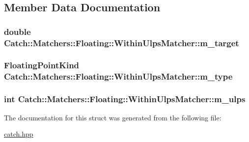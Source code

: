 \subsection{Member Data Documentation}
\hypertarget{struct_catch_1_1_matchers_1_1_floating_1_1_within_ulps_matcher_a97b0112726f510af8ca22cb490c2b14d}{
\subsubsection[{m\-\_\-target}]{\setlength{\rightskip}{0pt plus 5cm}double Catch\-::\-Matchers\-::\-Floating\-::\-Within\-Ulps\-Matcher\-::m\-\_\-target\hspace{0.3cm}{\ttfamily [private]}}}\label{struct_catch_1_1_matchers_1_1_floating_1_1_within_ulps_matcher_a97b0112726f510af8ca22cb490c2b14d}
\hypertarget{struct_catch_1_1_matchers_1_1_floating_1_1_within_ulps_matcher_ac5dc48ae38dbfe143647d450f03771ab}{
\subsubsection[{m\-\_\-type}]{\setlength{\rightskip}{0pt plus 5cm}Floating\-Point\-Kind Catch\-::\-Matchers\-::\-Floating\-::\-Within\-Ulps\-Matcher\-::m\-\_\-type\hspace{0.3cm}{\ttfamily [private]}}}\label{struct_catch_1_1_matchers_1_1_floating_1_1_within_ulps_matcher_ac5dc48ae38dbfe143647d450f03771ab}
\hypertarget{struct_catch_1_1_matchers_1_1_floating_1_1_within_ulps_matcher_aa117ee9be2778cdfb3ad5e66e94de1b3}{
\subsubsection[{m\-\_\-ulps}]{\setlength{\rightskip}{0pt plus 5cm}int Catch\-::\-Matchers\-::\-Floating\-::\-Within\-Ulps\-Matcher\-::m\-\_\-ulps\hspace{0.3cm}{\ttfamily [private]}}}\label{struct_catch_1_1_matchers_1_1_floating_1_1_within_ulps_matcher_aa117ee9be2778cdfb3ad5e66e94de1b3}


The documentation for this struct was generated from the following file\-:\begin{DoxyCompactItemize}
\item 
\hyperlink{catch_8hpp}{catch.\-hpp}\end{DoxyCompactItemize}
